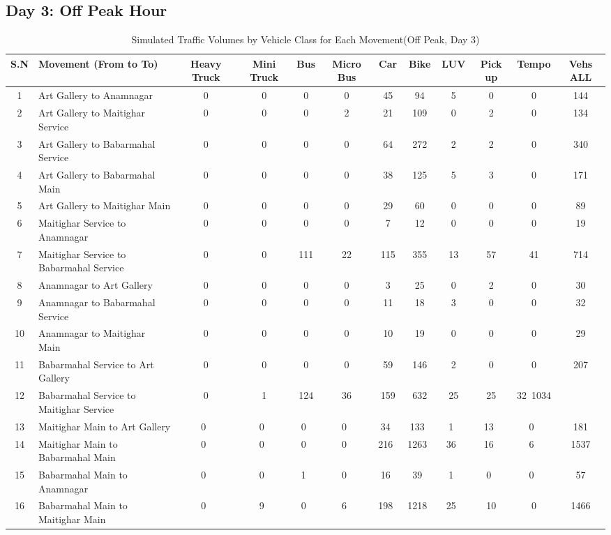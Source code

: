 \begin{landscape}
\section{Day 3: Off Peak Hour}
\begin{table}[h!]
\centering
\caption{Simulated Traffic Volumes by Vehicle Class for Each Movement(Off Peak, Day 3)}
\small
\setlength{\tabcolsep}{5pt}
\begin{tabular}{|c|p{6cm}|c|c|c|c|c|c|c|c|c|c|}
\hline
S.N& Movement (From to To)& Heavy Truck & Mini Truck & Bus & Micro Bus & Car & Bike & LUV & Pick up & Tempo & Vehs ALL \\ \hline
1	&Art Gallery to Anamnagar	&0	&0	&0	&0	&45	&94	&5	&0	&0	&144 \\ \hline
2	&Art Gallery to Maitighar Service	&0	&0	&0	&2	&21	&109	&0	&2	&0	&134 \\ \hline
3	&Art Gallery to Babarmahal Service	&0	&0	&0	&0	&64	&272	&2	&2	&0	&340 \\ \hline
4	&Art Gallery to Babarmahal Main	&0	&0	&0	&0	&38	&125	&5	&3	&0	&171 \\ \hline
5	&Art Gallery to Maitighar Main	&0	&0	&0	&0	&29	&60	&0	&0	&0	&89 \\ \hline
6	&Maitighar Service to Anamnagar	&0	&0	&0	&0	&7	&12	&0	&0	&0	&19 \\ \hline
7	&Maitighar Service to Babarmahal Service	&0	&0	&111	&22	&115	&355	&13	&57	&41	&714 \\ \hline
8	&Anamnagar to Art Gallery	&0	&0	&0	&0	&3	&25	&0	&2	&0	&30 \\ \hline
9	&Anamnagar to Babarmahal Service	&0	&0	&0	&0	&11	&18	&3	&0	&0	&32 \\ \hline
10	&Anamnagar to Maitighar Main	&0	&0	&0	&0	&10	&19	&0	&0	&0	&29 \\ \hline
11	&Babarmahal Service to Art Gallery	&0	&0	&0	&0	&59	&146	&2	&0	&0	&207 \\ \hline
12	&Babarmahal Service to Maitighar Service	&0	&1	&124	&36	&159	&632	&25	&25	&32 1034 \\ \hline
13  &Maitighar Main to Art Gallery &0 &0 &0 &0 &34 &133 &1 &13 &0 &181 \\ \hline
14  &Maitighar Main to Babarmahal Main &0 &0 &0 &0 &216 &1263 &36 &16 &6 &1537 \\ \hline
15  &Babarmahal Main to Anamnagar &0 &0 &1 &0 &16 &39 &1 &0 &0 &57 \\ \hline
16  &Babarmahal Main to Maitighar Main &0 &9 &0 &6 &198 &1218 &25 &10&0&1466 \\ \hline


\end{tabular}
\end{table}
\end{landscape}


